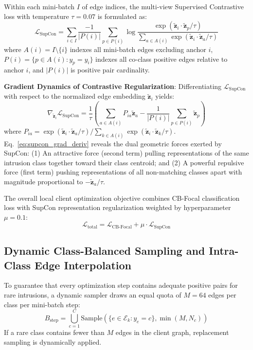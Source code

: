 \documentclass[12pt,a4paper]{report}
\begin{document}
Within each mini-batch $I$ of edge indices, the multi-view Supervised Contrastive loss with temperature $\tau = 0.07$ is formulated as:
\begin{equation}
\mathcal{L}_{\text{SupCon}} = \sum_{i \in I} \frac{-1}{|P(i)|} \sum_{p \in P(i)} \log \frac{\exp\left(\tilde{\boldsymbol{z}}_i \cdot \tilde{\boldsymbol{z}}_p / \tau\right)}{\displaystyle\sum_{a \in A(i)} \exp\left(\tilde{\boldsymbol{z}}_i \cdot \tilde{\boldsymbol{z}}_a / \tau\right)}
\label{eq:supcon_main}
\end{equation}
where $A(i) = I \setminus \{i\}$ indexes all mini-batch edges excluding anchor $i$, $P(i) = \{p \in A(i) : y_p = y_i\}$ indexes all co-class positive edges relative to anchor $i$, and $|P(i)|$ is positive pair cardinality.

\textbf{Gradient Dynamics of Contrastive Regularization}: Differentiating $\mathcal{L}_{\text{SupCon}}$ with respect to the normalized edge embedding $\tilde{\boldsymbol{z}}_i$ yields:
\begin{equation}
\nabla_{\tilde{\boldsymbol{z}}_i} \mathcal{L}_{\text{SupCon}} = \frac{1}{\tau} \left( \sum_{a \in A(i)} P_{ia} \tilde{\boldsymbol{z}}_a - \frac{1}{|P(i)|} \sum_{p \in P(i)} \tilde{\boldsymbol{z}}_p \right)
\label{eq:supcon_grad_deriv}
\end{equation}
where $P_{ia} = \exp(\tilde{\boldsymbol{z}}_i \cdot \tilde{\boldsymbol{z}}_a / \tau) / \sum_{k \in A(i)} \exp(\tilde{\boldsymbol{z}}_i \cdot \tilde{\boldsymbol{z}}_k / \tau)$. Eq.~\ref{eq:supcon_grad_deriv} reveals the dual geometric forces exerted by SupCon: (1) An attractive force (second term) pulling representations of the same intrusion class together toward their class centroid; and (2) A powerful repulsive force (first term) pushing representations of all non-matching classes apart with magnitude proportional to $-\tilde{\boldsymbol{z}}_a / \tau$.

The overall local client optimization objective combines CB-Focal classification loss with SupCon representation regularization weighted by hyperparameter $\mu = 0.1$:
\begin{equation}
\mathcal{L}_{\text{total}} = \mathcal{L}_{\text{CB-Focal}} + \mu \cdot \mathcal{L}_{\text{SupCon}}
\label{eq:joint_loss}
\end{equation}

\subsection{Dynamic Class-Balanced Sampling and Intra-Class Edge Interpolation}
To guarantee that every optimization step contains adequate positive pairs for rare intrusions, a dynamic sampler draws an equal quota of $M = 64$ edges per class per mini-batch step:
\begin{equation}
B_{\text{step}} = \bigcup_{c=1}^C \text{Sample}\left(\{e \in \mathcal{E}_k : y_e = c\}, \min(M, N_c)\right)
\end{equation}
If a rare class contains fewer than $M$ edges in the client graph, replacement sampling is dynamically applied.
\end{document}
